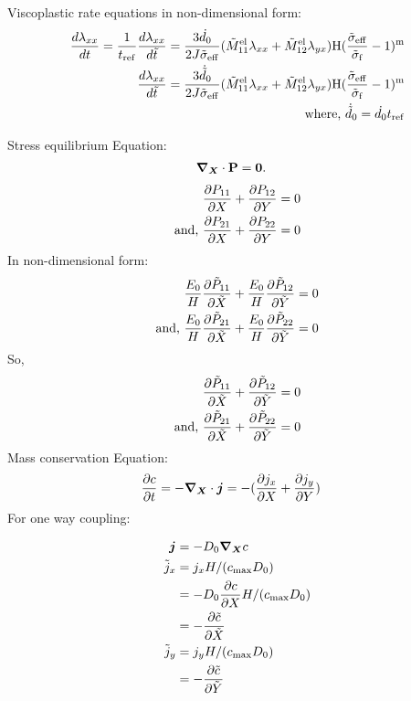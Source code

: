 \documentclass[../main.tex]{subfiles}
\begin{document}
Viscoplastic rate equations in non-dimensional form:
\begin{align}
    \frac{d \lambda_{xx}}{d t} = \frac{1}{t_{\rm{ref}}}\frac{d \lambda_{xx}}{d \tilde{t}} = \frac{3\dot{d_0}}{2 J \tilde{\sigma}_{\rm{eff}}}(\tilde{M}_{11}^{{\rm{el}}} \lambda_{xx} + \tilde{M}_{12}^{{\rm{el}}}\lambda_{yx})\text{H}(\frac{\tilde{\sigma}_{\rm{eff}}}{\tilde{\sigma}_{\rm{f}}} - 1 )^{\rm{m}} \\
   \frac{d \lambda_{xx}}{d \tilde{t}} = \frac{3\dot{\tilde{d}}_0}{2 J \tilde{\sigma}_{\rm{eff}}}(\tilde{M}_{11}^{{\rm{el}}} \lambda_{xx} + \tilde{M}_{12}^{{\rm{el}}}\lambda_{yx})\text{H}(\frac{\tilde{\sigma}_{\rm{eff}}}{\tilde{\sigma}_{\rm{f}}} - 1 )^{\rm{m}}\\
   \text{where, } \dot{\tilde{d}}_0 = \dot{d_0} t_{\rm{ref}}
\end{align}

Stress equilibrium Equation:
\begin{align}
    \bm{\nabla}_{\bm{X}} \cdot \mathbf{P} &= \bm{0}.
\end{align}
\begin{align}
    \frac{\partial P_{11}}{\partial X} + \frac{\partial P_{12}}{\partial  Y} &= 0 \\
    \text{and, } \frac{\partial P_{21}}{\partial X} + \frac{\partial P_{22}}{\partial Y} &= 0
\end{align}
In non-dimensional form:
\begin{align}
    \frac{E_0}{H} \frac{\partial \tilde{P}_{11}}{\partial \tilde{X}} + \frac{E_0}{H} \frac{\partial \tilde{P}_{12}}{\partial \tilde{Y}} &= 0 \\
    \text{and, } \frac{E_0}{H} \frac{\partial \tilde{P}_{21}}{\partial \tilde{X}} + \frac{E_0}{H} \frac{\partial \tilde{P}_{22}}{\partial \tilde{Y}} &= 0 
\end{align}
So, 
\begin{align}
    \frac{\partial \tilde{P}_{11}}{\partial \tilde{X}} + \frac{\partial \tilde{P}_{12}}{\partial \tilde{Y}} &= 0 \\
    \text{and, }   \frac{\partial \tilde{P}_{21}}{\partial \tilde{X}} +  \frac{\partial \tilde{P}_{22}}{\partial \tilde{Y}} &= 0 
\end{align}
Mass conservation Equation:
\begin{align}
    \frac{\partial c}{\partial t} &= - \bm{\nabla}_{\bm{X}} \cdot \bm{j} = -(\frac{\partial j_x}{\partial X} + \frac{\partial j_y}{\partial  Y}) 
\end{align}
For one way coupling:

\begin{align}
 \bm{j} &= -D_0 \bm{\nabla}_{\bm{X}}{c} \\
  \tilde{j}_x &= j_x H/({c_{\rm{max}}} D_0)\\
                                &= -D_0 \frac{\partial c}{\partial X} H/({c_{\rm{max}}} D_0)\\
                                &= -\frac{\partial \tilde{c}}{\partial \tilde{X}}\\
                    \tilde{j}_y &= j_y H/({c_{\rm{max}}} D_0)\\
                    &= -\frac{\partial \tilde{c}}{\partial \tilde{Y}}
\end{align}
\end{document}
